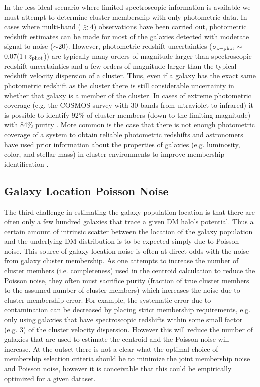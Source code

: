In the less ideal scenario where limited spectroscopic information is available we must attempt to determine cluster membership with only photometric data.
In cases where multi-band ($\gtrsim 4$) observations have been carried out, photometric redshift estimates can be made for most of the galaxies detected with moderate signal-to-noise ($\sim$20).
However, photometric redshift uncertainties ($\sigma_{\rm z-phot}\sim$0.07(1+$z_{\rm phot}$)) are typically many orders of magnitude larger than spectroscopic redshift uncertainties and a few orders of magnitude larger than the typical redshift velocity dispersion of a cluster.
Thus, even if a galaxy has the exact same photometric redshift as the cluster there is still considerable uncertainty in whether that galaxy is a member of the cluster.
In cases of extreme photometric coverage (e.g. the COSMOS survey with 30-bands from ultraviolet to infrared) it is possible to identify 92\% of cluster members (down to the limiting magnitude) with 84\% purity \citep{George:2011kv}.
More common is the case that there is not enough photometric coverage of a system to obtain reliable photometric redshifts and astronomers have used prior information about the properties of galaxies (e.g. luminosity, color, and stellar mass)  in cluster environments to improve membership identification \citep[see][for a review]{George:2012uo}. 

\subsection{Galaxy Location Poisson Noise}

The third challenge in estimating the galaxy population location is that there are often only a few hundred galaxies that trace a given DM halo's potential.
Thus a certain amount of intrinsic scatter between the location of the galaxy population and the underlying DM distribution is to be expected simply due to Poisson noise.
This source of galaxy location noise is often at direct odds with the noise from galaxy cluster membership.
As one attempts to increase the number of cluster members (i.e. completeness) used in the centroid calculation to reduce the Poisson noise, they often must sacrifice purity (fraction of true cluster members to the assumed number of cluster members) which increases the noise due to cluster membership error.
For example, the systematic error due to contamination can be decreased by placing strict membership requirements, e.g. only using galaxies that have spectroscopic redshifts within some small factor (e.g. 3) of the cluster velocity dispersion.
However this will reduce the number of galaxies that are used to estimate the centroid and the Poisson noise will increase.
At the outset there is not a clear what the optimal choice of membership selection criteria should be to minimize the joint membership noise and Poisson noise, however it is conceivable that this could be empirically optimized for a given dataset.

